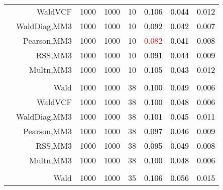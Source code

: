 \documentclass[
]{article}
\begin{document}
\begin{table}[H]
{\begin{tabular}[t]{lrrrrrrr}
\hspace{1em} & WaldVCF & 1000 & 1000 & 10 & \textcolor{black}{0.106} & \textcolor{black}{0.044} & \textcolor{black}{0.012}\\

\hspace{1em} & WaldDiag,MM3 & 1000 & 1000 & 10 & \textcolor{black}{0.092} & \textcolor{black}{0.042} & \textcolor{black}{0.007}\\

\hspace{1em} & Pearson,MM3 & 1000 & 1000 & 10 & \textcolor{red}{0.082} & \textcolor{black}{0.041} & \textcolor{black}{0.008}\\

\hspace{1em} & RSS,MM3 & 1000 & 1000 & 10 & \textcolor{black}{0.091} & \textcolor{black}{0.044} & \textcolor{black}{0.009}\\

\hspace{1em} & Multn,MM3 & 1000 & 1000 & 10 & \textcolor{black}{0.105} & \textcolor{black}{0.043} & \textcolor{black}{0.012}\\
\cmidrule{1-8}
\addlinespace[0.3em]
\multicolumn{8}{l}{\textbf{1F 15V}}\\
\hspace{1em} & Wald & 1000 & 1000 & 38 & \textcolor{black}{0.100} & \textcolor{black}{0.049} & \textcolor{black}{0.006}\\

\hspace{1em} & WaldVCF & 1000 & 1000 & 38 & \textcolor{black}{0.100} & \textcolor{black}{0.048} & \textcolor{black}{0.006}\\

\hspace{1em} & WaldDiag,MM3 & 1000 & 1000 & 38 & \textcolor{black}{0.101} & \textcolor{black}{0.045} & \textcolor{black}{0.011}\\

\hspace{1em} & Pearson,MM3 & 1000 & 1000 & 38 & \textcolor{black}{0.097} & \textcolor{black}{0.046} & \textcolor{black}{0.009}\\

\hspace{1em} & RSS,MM3 & 1000 & 1000 & 38 & \textcolor{black}{0.095} & \textcolor{black}{0.049} & \textcolor{black}{0.008}\\

\hspace{1em} & Multn,MM3 & 1000 & 1000 & 38 & \textcolor{black}{0.100} & \textcolor{black}{0.048} & \textcolor{black}{0.006}\\
\cmidrule{1-8}
\addlinespace[0.3em]
\multicolumn{8}{l}{\textbf{2F 10V}}\\
\hspace{1em} & Wald & 1000 & 1000 & 35 & \textcolor{black}{0.106} & \textcolor{black}{0.056} & \textcolor{black}{0.015}\\


\end{tabular}}
\end{table}
\end{document}
